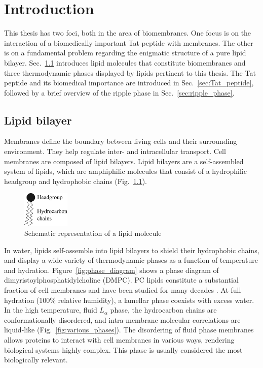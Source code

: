 \chapter{Introduction}
This thesis has two foci, both in the area of biomembranes.
One focus is on the interaction of a biomedically important Tat peptide with 
membranes.
The other is on a fundamental problem regarding the enigmatic structure of a
pure lipid bilayer.
Sec.~\ref{sec:lipid_bilayer} introduces lipid molecules that constitute
biomembranes and three thermodynamic phases displayed by lipids pertinent to this 
thesis.
The Tat peptide and its biomedical importance are introduced in Sec.~\ref{sec:Tat_peptide},
followed by a brief overview of the ripple phase in Sec.~\ref{sec:ripple_phase}.


\section{Lipid bilayer}\label{sec:lipid_bilayer}
Membranes define the boundary between living cells
and their surrounding environment. They help regulate inter- and intracellular
transport. Cell membranes are composed of lipid bilayers.
Lipid bilayers are a self-assembled system of lipids, which are 
amphiphilic molecules that consist of a hydrophilic headgroup
and hydrophobic chains (Fig.~\ref{fig:lipid}).

\begin{figure}
  \centering
  \includegraphics[width=0.2\textwidth]{figures/lipid}
  \caption{Schematic representation of a lipid molecule}
  \label{fig:lipid}
\end{figure}

In water, lipids self-assemble into lipid bilayers to shield their hydrophobic 
chains, and display a wide variety of thermodynamic phases
as a function of temperature and hydration. Figure~\ref{fig:phase_diagram}
shows a phase diagram of dimyristoylphosphatidylcholine (DMPC).
PC lipids constitute a substantial fraction of cell membranes
and have been studied for many decades \cite{Nagle00}.
At full hydration (100\% relative humidity), a lamellar phase coexists with excess water.
In the high temperature, fluid $L_\alpha$ phase, the hydrocarbon chains 
are conformationally disordered, and intra-membrane molecular correlations 
are liquid-like \cite{ref:Fahey78} (Fig.~\ref{fig:various_phases}).
The disordering of fluid phase membranes allows proteins to 
interact with cell membranes in various ways, rendering biological systems
highly complex. 
This phase is usually considered the most biologically relevant.

